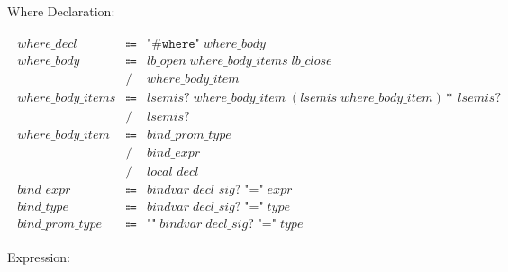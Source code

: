Where Declaration:

\begin{align*}
    \begin{array}{rcll}
        \mathit{where\_decl}
        &\Coloneq &\texttt{"\#where"}\; \mathit{where\_body} \\
        \mathit{where\_body}
        &\Coloneq &\mathit{lb\_open}\; \mathit{where\_body\_items}\; \mathit{lb\_close} \\
        &\mathrel{/} &\mathit{where\_body\_item} \\
        \mathit{where\_body\_items}
        &\Coloneq &\mathit{lsemis}{?}\; \mathit{where\_body\_item}\; (\mathit{lsemis}\; \mathit{where\_body\_item}){*}\; \mathit{lsemis}{?} \\
        &\mathrel{/} &\mathit{lsemis}{?} \\
        \mathit{where\_body\_item}
        &\Coloneq &\mathit{bind\_prom\_type} \\
        &\mathrel{/} &\mathit{bind\_expr} \\
        &\mathrel{/} &\mathit{local\_decl} \\
        \mathit{bind\_expr}
        &\Coloneq &\mathit{bindvar}\; \mathit{decl\_sig}{?}\; \texttt{"="}\; \mathit{expr} \\
        \mathit{bind\_type}
        &\Coloneq &\mathit{bindvar}\; \mathit{decl\_sig}{?}\; \texttt{"="}\; \mathit{type} \\
        \mathit{bind\_prom\_type}
        &\Coloneq &\texttt{"\^{}"}\; \mathit{bindvar}\; \mathit{decl\_sig}{?}\; \texttt{"="}\; \mathit{type}
    \end{array}
\end{align*}

Expression:

